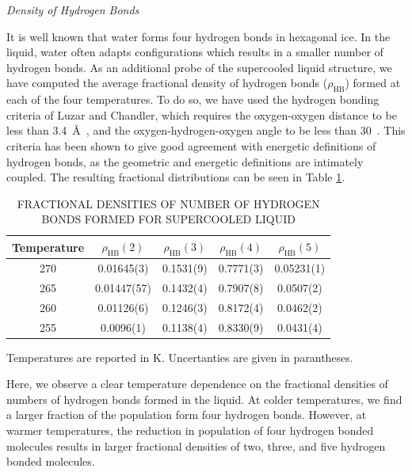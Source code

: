 \begin{flushleft}
\textit{Density of Hydrogen Bonds}
\end{flushleft}

It is well known that water forms four hydrogen bonds in hexagonal
ice. In the liquid, water often adapts configurations which results in
a smaller number of hydrogen bonds. As an additional probe of the
supercooled liquid structure, we have computed the average fractional
density of hydrogen bonds ($\rho_\mathrm{HB}$) formed at each of the
four temperatures. To do so, we have used the hydrogen bonding
criteria of Luzar and Chandler, which requires the oxygen-oxygen
distance to be less than 3.4~\AA~, and the oxygen-hydrogen-oxygen
angle to be less than 30\degree~. This criteria has been shown to give
good agreement with energetic definitions of hydrogen bonds, as the
geometric and energetic definitions are intimately coupled. The
resulting fractional distributions can be seen in Table
\ref{tab:bulk_HB}.


\begin{table}[h] \centering \caption{FRACTIONAL DENSITIES OF NUMBER OF
    HYDROGEN BONDS FORMED FOR SUPERCOOLED LIQUID\label{tab:bulk_HB}}
\begin{tabular}{ccccc}
\hline
\hline
 Temperature & $\rho_\mathrm{HB}(2)$ & $\rho_\mathrm{HB}(3)$ & $\rho_\mathrm{HB}(4)$ & $\rho_\mathrm{HB}(5)$  \\
\hline
270 & 0.01645(3) & 0.1531(9) & 0.7771(3) & 0.05231(1)\\
265 & 0.01447(57) & 0.1432(4) & 0.7907(8) & 0.0507(2)\\
260 & 0.01126(6) & 0.1246(3) & 0.8172(4) & 0.0462(2)  \\
255 & 0.0096(1) & 0.1138(4) & 0.8330(9) & 0.0431(4) \\
\hline
\hline
\end{tabular}
\begin{flushleft}
Temperatures are reported in K. Uncertanties are given in parantheses.
\end{flushleft}
\end{table}

Here, we observe a clear temperature dependence on the fractional
densities of numbers of hydrogen bonds formed in the liquid. At colder
temperatures, we find a larger fraction of the population form four
hydrogen bonds. However, at warmer temperatures, the reduction in
population of four hydrogen bonded molecules results in larger
fractional densities of two, three, and five hydrogen bonded
molecules. 



